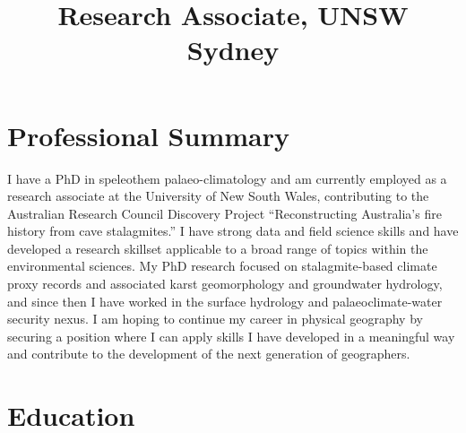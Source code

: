 \documentclass[11pt,a4paper,]{moderncv}
\title{Research Associate, UNSW Sydney}
\begin{document}
\makecvtitle



\hypertarget{professional-summary}{%
\section{Professional Summary}\label{professional-summary}}

I have a PhD in speleothem palaeo-climatology and am currently employed
as a research associate at the University of New South Wales,
contributing to the Australian Research Council Discovery Project
``Reconstructing Australia's fire history from cave stalagmites.'' I
have strong data and field science skills and have developed a research
skillset applicable to a broad range of topics within the environmental
sciences. My PhD research focused on stalagmite-based climate proxy
records and associated karst geomorphology and groundwater hydrology,
and since then I have worked in the surface hydrology and
palaeoclimate-water security nexus. I am hoping to continue my career in
physical geography by securing a position where I can apply skills I
have developed in a meaningful way and contribute to the development of
the next generation of geographers.

\hypertarget{education}{%
\section{Education}\label{education}}

\nopagebreak
    \nopagebreak
\end{document}
